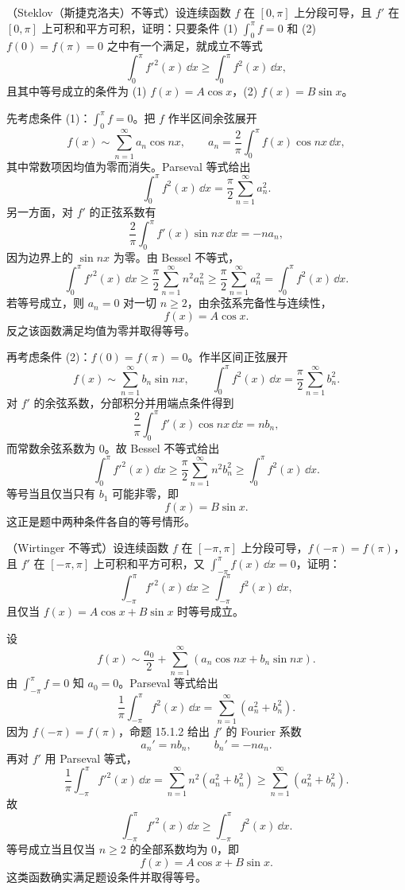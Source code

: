 \begin{xreferenceproblem}[7]
（Steklov（斯捷克洛夫）不等式）设连续函数 $f$ 在 $[0,\pi]$ 上分段可导，且 $f'$ 在 $[0,\pi]$ 上可积和平方可积，证明：只要条件 (1) $\int_0^{\pi}f=0$ 和 (2) $f(0)=f(\pi)=0$ 之中有一个满足，就成立不等式
  \[
    \int_0^{\pi}f'^2(x)\,\dd x\ge\int_0^{\pi}f^2(x)\,\dd x,
  \]
  且其中等号成立的条件为 (1) $f(x)=A\cos x$，(2) $f(x)=B\sin x$。
\end{xreferenceproblem}
\begin{xsolution}
先考虑条件 (1)：$\int_0^\pi f=0$。把 $f$ 作半区间余弦展开
\[
  f(x)\sim\sum_{n=1}^{\infty}a_n\cos nx,
\qquad
  a_n=\frac2\pi\int_0^\pi f(x)\cos nx\,\dd x,
\]
其中常数项因均值为零而消失。Parseval 等式给出
\[
  \int_0^\pi f^2(x)\,\dd x
  =\frac\pi2\sum_{n=1}^{\infty}a_n^2.
\]
另一方面，对 $f'$ 的正弦系数有
\[
  \frac2\pi\int_0^\pi f'(x)\sin nx\,\dd x
  =-n a_n,
\]
因为边界上的 $\sin nx$ 为零。由 Bessel 不等式，
\[
  \int_0^\pi f'^2(x)\,\dd x
  \ge\frac\pi2\sum_{n=1}^{\infty}n^2a_n^2
  \ge\frac\pi2\sum_{n=1}^{\infty}a_n^2
  =\int_0^\pi f^2(x)\,\dd x.
\]
若等号成立，则 $a_n=0$ 对一切 $n\ge2$，由余弦系完备性与连续性，
\[
  f(x)=A\cos x.
\]
反之该函数满足均值为零并取得等号。

再考虑条件 (2)：$f(0)=f(\pi)=0$。作半区间正弦展开
\[
  f(x)\sim\sum_{n=1}^{\infty}b_n\sin nx,
\qquad
  \int_0^\pi f^2(x)\,\dd x=\frac\pi2\sum_{n=1}^{\infty}b_n^2.
\]
对 $f'$ 的余弦系数，分部积分并用端点条件得到
\[
  \frac2\pi\int_0^\pi f'(x)\cos nx\,\dd x=n b_n,
\]
而常数余弦系数为 $0$。故 Bessel 不等式给出
\[
  \int_0^\pi f'^2(x)\,\dd x
  \ge\frac\pi2\sum_{n=1}^{\infty}n^2b_n^2
  \ge\int_0^\pi f^2(x)\,\dd x.
\]
等号当且仅当只有 $b_1$ 可能非零，即
\[
  f(x)=B\sin x.
\]
这正是题中两种条件各自的等号情形。
\end{xsolution}


\begin{xreferenceproblem}[8]
（Wirtinger 不等式）设连续函数 $f$ 在 $[-\pi,\pi]$ 上分段可导，$f(-\pi)=f(\pi)$，且 $f'$ 在 $[-\pi,\pi]$ 上可积和平方可积，又 $\int_{-\pi}^{\pi}f(x)\,\dd x=0$，证明：
  \[
    \int_{-\pi}^{\pi}f'^2(x)\,\dd x\ge\int_{-\pi}^{\pi}f^2(x)\,\dd x,
  \]
  且仅当 $f(x)=A\cos x+B\sin x$ 时等号成立。
\end{xreferenceproblem}
\begin{xsolution}
设
\[
  f(x)\sim\frac{a_0}{2}+\sum_{n=1}^{\infty}(a_n\cos nx+b_n\sin nx).
\]
由 $\int_{-\pi}^{\pi}f=0$ 知 $a_0=0$。Parseval 等式给出
\[
  \frac1\pi\int_{-\pi}^{\pi}f^2(x)\,\dd x
  =\sum_{n=1}^{\infty}(a_n^2+b_n^2).
\]
因为 $f(-\pi)=f(\pi)$，命题 15.1.2 给出 $f'$ 的 Fourier 系数
\[
  a_n'=n b_n,\qquad b_n'=-n a_n.
\]
再对 $f'$ 用 Parseval 等式，
\[
  \frac1\pi\int_{-\pi}^{\pi}f'^2(x)\,\dd x
  =\sum_{n=1}^{\infty}n^2(a_n^2+b_n^2)
  \ge\sum_{n=1}^{\infty}(a_n^2+b_n^2).
\]
故
\[
  \boxed{\displaystyle
  \int_{-\pi}^{\pi}f'^2(x)\,\dd x
  \ge\int_{-\pi}^{\pi}f^2(x)\,\dd x }.
\]
等号成立当且仅当 $n\ge2$ 的全部系数均为 $0$，即
\[
  \boxed{f(x)=A\cos x+B\sin x}.
\]
这类函数确实满足题设条件并取得等号。
\end{xsolution}


